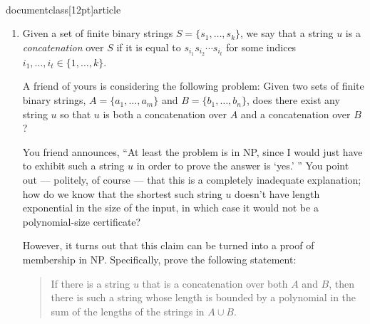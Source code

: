 \\documentclass[12pt]{article}
\begin{document}
\begin{enumerate}
{}


\item

Given a set of finite binary strings $S = \{s_1, \ldots, s_k\}$,
we say that a string $u$ is a {\em concatenation} over $S$
if it is equal to $s_{i_1} s_{i_2} \cdots s_{i_t}$
for some indices $i_1, \ldots, i_t \in \{1, \ldots, k\}$.

A friend of yours is considering the following problem:
Given two sets of finite binary strings, $A = \{a_1, \ldots, a_m\}$
and $B = \{b_1, \ldots, b_n\}$,
does there exist any string $u$ so that $u$ is both
a concatenation over $A$ and a concatenation over $B$?

You friend announces, ``At least the problem is in NP,
since I would just have to exhibit such a string $u$ in order
to prove the answer is `yes.' ''
You point out --- politely, of course --- that this is
a completely inadequate explanation; how do we know that
the shortest such string
$u$ doesn't have length exponential in the size of the input,
in which case it would not be a polynomial-size certificate?

However, it turns out that this claim can be turned
into a proof of membership in NP.
Specifically, prove the following statement:
\begin{quote}
If there is a string $u$ that is a concatenation over both $A$ and $B$,
then there is such a string whose length is bounded by
a polynomial in the sum of the lengths of the strings in $A \cup B$.
\end{quote}

\end{enumerate}
\end{document}

